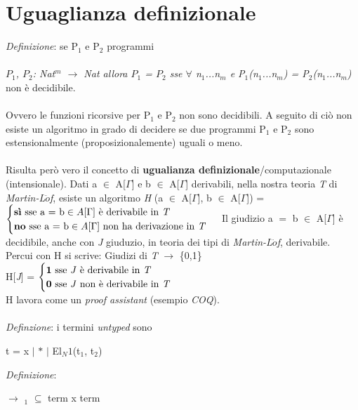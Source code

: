 \documentclass[10pt,a4paper, italian]{book}
\begin{document}
{{{\section{Uguaglianza definizionale}
\label{sec: uguaglianza-definizionale}
\textit{Definizione}: se P$_1$ e P$_2$ programmi\\\\
\textit{$P_1$, $P_2$: Nat$^m$  $\rightarrow$ Nat \quad allora \quad
$P_1$ = $P_2$ sse $\forall$ n$_1$...n$_m$ e P$_1$(n$_1$...n$_m$) = P$_2$(n$_1$...n$_m$)} non \`e decidibile.\\\\
Ovvero le funzioni ricorsive per P$_1$ e P$_2$ non sono decidibili. A seguito di ci\`o non esiste un algoritmo in grado di decidere se due programmi P$_1$ e P$_2$ sono estensionalmente (proposizionalemente) uguali o meno.\\\\
Risulta per\`o vero il concetto di \textbf{ugualianza definizionale}/computazionale (intensionale). Dati a $\in$ A[$\Gamma$] e b $\in$ A[$\Gamma$] derivabili, nella nostra teoria \textit{T} di \textit{Martin-L$\ddot{o}$f}, esiste un algoritmo \textit{H} (a $\in$ A[$\Gamma$], b $\in$ A[$\Gamma$]) =
$
\begin{cases}
\text{\textbf{sì} sse a = b} \in A[\Gamma]  \text{ è derivabile in \textit{T}} \\
\text{\textbf{no} sse a = b} \in A[\Gamma] \text{ non ha derivazione in \textit{T}}
\end{cases}
$
Il giudizio a $=$ b $\in$ A[$\Gamma$] \`e decidibile, anche con \textit{J} giuduzio, in teoria dei tipi di \textit{Martin-L$\ddot{o}$f}, derivabile. Percui con H si scrive: Giudizi di \textit{T} $\rightarrow$ \{0,1\}\\
H[\textit{J}] =
$
\begin{cases}
\textbf{1} \text{ sse \textit{J} è derivabile in \textit{T}}  \\
\textbf{0} \text{ sse \textit{J} non è derivabile in \textit{T}}
\end{cases}
$
\\
H lavora come un \textit{proof assistant} (esempio \textit{COQ}).\\\\
\noindent
\textit{Definzione}: i termini \textit{untyped} sono
\begin{center}t = x $|$ $\ast$ $|$ El$_N1$(t$_1$, t$_2$)\end{center}
\textit{Definizione}: \begin{center}$\rightarrow$ $_1$ $\subseteq$ term x term\end{center}
}}}
\end{document}
